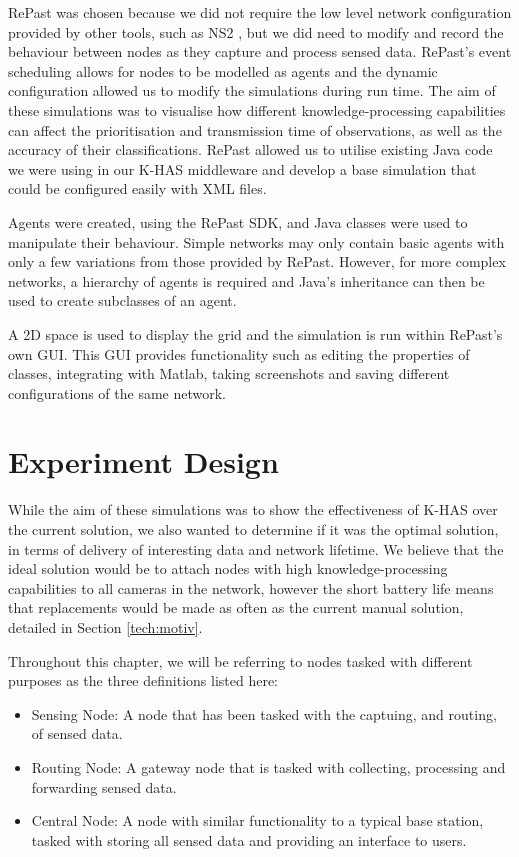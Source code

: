 RePast was chosen because we did not require the low level network configuration provided by other tools, such as NS2 \cite{mccanne1997network}, but we did need to modify and record the behaviour between nodes as they capture and process sensed data. RePast's event scheduling allows for nodes to be modelled as agents and the dynamic configuration allowed us to modify the simulations during run time. The aim of these simulations was to visualise how different knowledge-processing capabilities can affect the prioritisation and transmission time of observations, as well as the accuracy of their classifications. RePast allowed us to utilise existing Java code we were using in our K-HAS middleware and develop a base simulation that could be configured easily with XML files.

Agents were created, using the RePast SDK, and Java classes were used to manipulate their behaviour. Simple networks may only contain basic agents with only a few variations from those provided by RePast. However, for more complex networks, a hierarchy of agents is required and Java's inheritance can then be used to create subclasses of an agent.

A 2D space is used to display the grid and the simulation is run within RePast's own GUI. This GUI provides functionality such as editing the properties of classes, integrating with Matlab, taking screenshots and saving different configurations of the same network.

\section{Experiment Design}\label{sim:imp}
	While the aim of these simulations was to show the effectiveness of K-HAS over the current solution, we also wanted to determine if it was the optimal solution, in terms of delivery of interesting data and network lifetime. We believe that the ideal solution would be to attach nodes with high knowledge-processing capabilities to all cameras in the network, however the short battery life means that replacements would be made as often as the current manual solution, detailed in Section \ref{tech:motiv}.

	Throughout this chapter, we will be referring to nodes tasked with different purposes as the three definitions listed here:
	\begin{itemize}
		\item Sensing Node: A node that has been tasked with the captuing, and routing, of sensed data.
		\item Routing Node: A gateway node that is tasked with collecting, processing and forwarding sensed data.
		\item Central Node: A node with similar functionality to a typical base station, tasked with storing all sensed data and providing an interface to users.
	\end{itemize}

